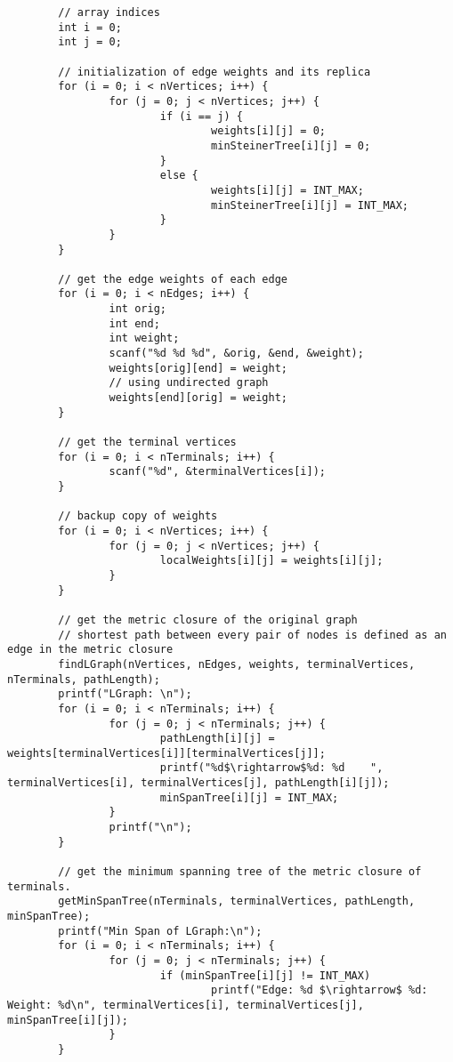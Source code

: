 \documentclass[a4paper]{article}
\begin{document}
\begin{lstlisting}
        // array indices
        int i = 0;
        int j = 0;

        // initialization of edge weights and its replica
        for (i = 0; i < nVertices; i++) {
                for (j = 0; j < nVertices; j++) {
                        if (i == j) {
                                weights[i][j] = 0;
                                minSteinerTree[i][j] = 0;
                        }
                        else {
                                weights[i][j] = INT_MAX;
                                minSteinerTree[i][j] = INT_MAX;
                        }
                }
        }

        // get the edge weights of each edge
        for (i = 0; i < nEdges; i++) {
                int orig;
                int end;
                int weight;
                scanf("%d %d %d", &orig, &end, &weight);
                weights[orig][end] = weight;
                // using undirected graph
                weights[end][orig] = weight;
        }

        // get the terminal vertices
        for (i = 0; i < nTerminals; i++) {
                scanf("%d", &terminalVertices[i]);
        }

        // backup copy of weights
        for (i = 0; i < nVertices; i++) {
                for (j = 0; j < nVertices; j++) {
                        localWeights[i][j] = weights[i][j];
                }
        }

        // get the metric closure of the original graph
        // shortest path between every pair of nodes is defined as an edge in the metric closure
        findLGraph(nVertices, nEdges, weights, terminalVertices, nTerminals, pathLength);
        printf("LGraph: \n");
        for (i = 0; i < nTerminals; i++) {
                for (j = 0; j < nTerminals; j++) {
                        pathLength[i][j] = weights[terminalVertices[i]][terminalVertices[j]];
                        printf("%d$\rightarrow$%d: %d    ", terminalVertices[i], terminalVertices[j], pathLength[i][j]);
                        minSpanTree[i][j] = INT_MAX;
                }
                printf("\n");
        }

        // get the minimum spanning tree of the metric closure of terminals.
        getMinSpanTree(nTerminals, terminalVertices, pathLength, minSpanTree);
        printf("Min Span of LGraph:\n");
        for (i = 0; i < nTerminals; i++) {
                for (j = 0; j < nTerminals; j++) {
                        if (minSpanTree[i][j] != INT_MAX)
                                printf("Edge: %d $\rightarrow$ %d: Weight: %d\n", terminalVertices[i], terminalVertices[j], minSpanTree[i][j]);
                }
        }


\end{lstlisting}
\end{document}
